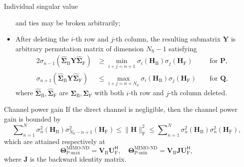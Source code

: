 \documentclass[final,xcolor={table}]{beamer}
\newlength{\colwidth}
\begin{document}
\begin{frame}[t]
\begin{columns}[t]
\begin{column}{\colwidth}
\begin{coro}{Individual singular value}{}
\begin{itemize}
					and ties may be broken arbitrarily;
					\item After deleting the $i$-th row and $j$-th column, the resulting submatrix $\mathbf{Y}$ is arbitrary permutation matrix of dimension $N_\mathrm{S}-1$ satisfying
					\begin{alignat*}{2}
						\sigma_{n{-}1}(\hat{\mathbf{\Sigma}}_{\mathrm{B}} \mathbf{Y} \hat{\mathbf{\Sigma}}_{\mathrm{F}}) & {\ge} \min_{i+j=n+1} \sigma_i(\mathbf{H}_\mathrm{B}) \sigma_j(\mathbf{H}_\mathrm{F}) && \text{ for } \mathbf{P}, \\
						\sigma_{n{+}1}(\hat{\mathbf{\Sigma}}_{\mathrm{B}} \mathbf{Y} \hat{\mathbf{\Sigma}}_{\mathrm{F}}) & {\le} \max_{i+j=n+N_\mathrm{S}} \sigma_i(\mathbf{H}_\mathrm{B}) \sigma_j(\mathbf{H}_\mathrm{F}) && \text{ for } \mathbf{Q},
					\end{alignat*}
					where $\hat{\mathbf{\Sigma}}_{\mathrm{B}}, \hat{\mathbf{\Sigma}}_{\mathrm{F}}$ are ${\mathbf{\Sigma}}_{\mathrm{B}}, {\mathbf{\Sigma}}_{\mathrm{F}}$ with both $i$-th row and $j$-th column deleted.
				\end{itemize}
			\end{coro}

			\begin{coro}{Channel power gain}{}
				\setlength{\leftskip}{\leftmargini}
				\setlength{\rightskip}{\leftmargini}
				If the direct channel is negligible, then the channel power gain is bounded by
				\begin{equation*}
					\sum\nolimits_{n=1}^N \sigma_n^2(\mathbf{H}_\mathrm{B}) \sigma_{N_\mathrm{S}-n+1}^2(\mathbf{H}_\mathrm{F}) \le \lVert \mathbf{H} \rVert _\mathrm{F}^2 \le \sum\nolimits_{n=1}^N \sigma_n^2(\mathbf{H}_\mathrm{B}) \sigma_n^2(\mathbf{H}_\mathrm{F}),
				\end{equation*}
				which are attained respectively at
				\begin{equation*}
					\mathbf{\Theta}_\text{P-max}^\text{MIMO-ND} = \mathbf{V}_\mathrm{B} \mathbf{U}_\mathrm{F}^\mathsf{H}, \quad \mathbf{\Theta}_\text{P-min}^\text{MIMO-ND} = \mathbf{V}_\mathrm{B} \mathbf{J} \mathbf{U}_\mathrm{F}^\mathsf{H},
				\end{equation*}
				where $\mathbf{J}$ is the backward identity matrix.
			\end{coro}


\end{column}
\end{columns}
\end{frame}
\end{document}
